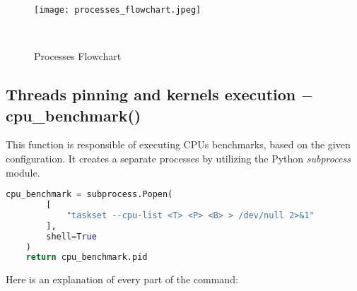 \begin{figure}[hbtp!]
    \centering
    \texttt{[image: processes\_flowchart.jpeg]}
    \caption{Processes Flowchart}~\label{fig:processes_flowchart}
\end{figure}

\newpage

\subsection{Threads pinning and kernels execution $-$ cpu\_benchmark()}

This function is responsible of executing CPUs benchmarks, based on the
given configuration. It creates a separate processes by utilizing the
Python \emph{subprocess} module. 

\begin{lstlisting}[language=Python]
    cpu_benchmark = subprocess.Popen(
        [
            "taskset --cpu-list <T> <P> <B> > /dev/null 2>&1"
        ],
        shell=True
    )
    return cpu_benchmark.pid
\end{lstlisting}

Here is an explanation of every part of the command:

